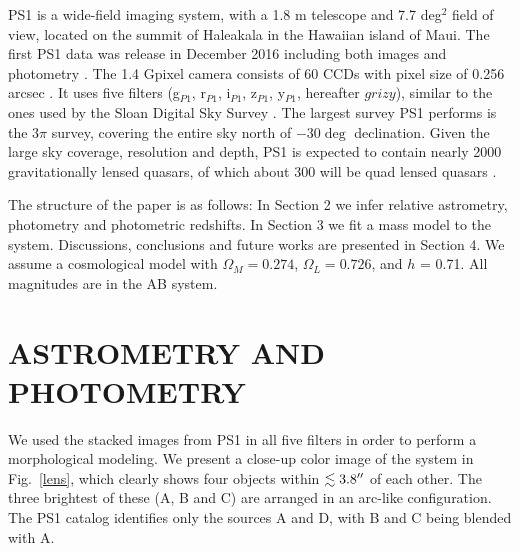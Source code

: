 \documentclass[manuscript]{aastex}
\begin{document}
PS1 is a wide-field imaging system, with a 1.8 m telescope and 7.7 deg$^2$ field of view, located on the summit of Haleakala in the Hawaiian island of Maui. The first PS1 data was release in December 2016 including both images and photometry \citep[see][]{cha16}. The 1.4 Gpixel camera consists of 60 CCDs with pixel size of 0.256 arcsec \citep{ona08, ton09}. It uses five filters (g$_{P1}$, r$_{P1}$, i$_{P1}$, z$_{P1}$, y$_{P1}$, hereafter $grizy$), similar to the ones used by the Sloan Digital Sky Survey \citep[SDSS;][]{york00}. The largest survey PS1 performs is the 3$\pi$ survey, covering the entire sky north of $-30\deg$ declination. Given the large sky coverage, resolution and depth, PS1 is expected to contain nearly 2000 gravitationally lensed quasars, of which about 300 will be quad lensed quasars \citep{ogu10}.
 
The structure of the paper is as follows:
In Section 2 we infer relative astrometry, photometry and photometric redshifts. In Section 3 we fit a mass model to the system. Discussions, conclusions and future works are presented in Section 4. We assume a cosmological model with $\Omega_M = 0.274$, $\Omega_L = 0.726$, and $h$ = 0.71. All magnitudes are in the AB system. 

\section{ASTROMETRY AND PHOTOMETRY}


We used the stacked images from PS1 in all five filters in order to perform a morphological modeling. We present a close-up color image of the system in Fig.~\ref{lens}, which clearly shows four objects within $\lesssim 3.8\mbox{$^{\prime\prime}$}$ of each other. The three brightest of these (A, B and C) are arranged in an arc-like configuration. The PS1 catalog identifies only the sources A and D, with B and C being blended with A. 
\end{document}
